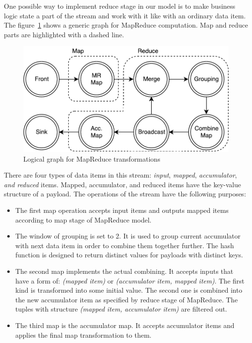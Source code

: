 One possible way to implement reduce stage in our model is to make business logic state a part of the stream and work with it like with an ordinary data item. The figure~\ref{mapreduce-graph-figure} shows a generic graph for MapReduce computation. Map and reduce parts are highlighted with a dashed line.

\begin{figure}[htb]
  \centering
  \includegraphics[scale=0.5]{pics/mapreduce}
  \caption{Logical graph for MapReduce transformations}
  \label {mapreduce-graph-figure}
\end{figure}

There are four types of data items in this stream: {\it input}, {\it mapped}, {\it accumulator}, {\it and reduced} items. Mapped, accumulator, and reduced items have the key-value structure of a payload. The operations of the stream have the following purposes:

\begin{itemize}
  \item The first map operation accepts input items and outputs mapped items according to map stage of MapReduce model.
  \item The window of grouping is set to 2. It is used to group current accumulator with next data item in order to combine them together further. The hash function is designed to return distinct values for payloads with distinct keys.
  \item The second map implements the actual combining. It accepts inputs that have a form of: \textit{(mapped item)} or \textit{(accumulator item, mapped item)}. The first kind is transformed into some initial value. The second one is combined into the new accumulator item as specified by reduce stage of MapReduce. The tuples with structure \textit{(mapped item, accumulator item)} are filtered out.
  \item The third map is the accumulator map. It accepts accumulator items and applies the final map transformation to them.
\end{itemize}

